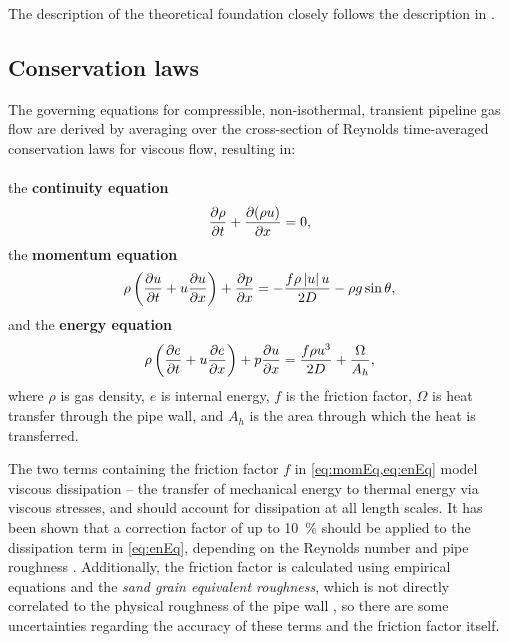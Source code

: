 The description of the theoretical foundation closely follows the description in \cite{Chaczykowski2017}. 

\subsection{Conservation laws}
The governing equations for compressible, non-isothermal, transient pipeline gas flow are derived by averaging over the cross-section of Reynolds time-averaged conservation laws for viscous flow, resulting in: \\\\
the \textbf{continuity equation}
\begin{align}
    \pdt{\rho} + \pdx{(\rho u)} = 0
, \label{eq:contEq}
\end{align}
the \textbf{momentum equation} \cite{Daneshyar1976OneDimensional}
\begin{align}
    \rho\del{\pdt{u} + u \pdx{u}} + \pdx{p} = -\frac{f\rho \abs{u} u}{2D} - \rho g \sin \theta
, \label{eq:momEq}
\end{align}
and the \textbf{energy equation} \cite{White2006Viscous}
\begin{align}
    \rho\del{\pdt{e} + u\pdx{e}} + p\pdx{u} = \frac{f\rho u^3}{2D} + \frac{\Omega}{A_h}
, \label{eq:enEq}
\end{align}
where $\rho$ is gas density, $e$ is internal energy, $f$ is the friction factor, $\Omega$ is heat transfer through the pipe wall, and $A_h$ is the area through which the heat is transferred. 

The two terms containing the friction factor $f$ in \cref{eq:momEq,eq:enEq} model viscous dissipation -- the transfer of mechanical energy to thermal energy via viscous stresses, and should account for dissipation at all length scales. It has been shown that a correction factor of up to \SI{10}{\percent} should be applied to the dissipation term in \cref{eq:enEq}, depending on the Reynolds number and pipe roughness \cite{Ytrehus2013Energy}. Additionally, the friction factor is calculated using empirical equations and the \emph{sand grain equivalent roughness}, which is not directly correlated to the physical roughness of the pipe wall \cite{Langelandsvik2008Flow}, so there are some uncertainties regarding the accuracy of these terms and the friction factor itself.

